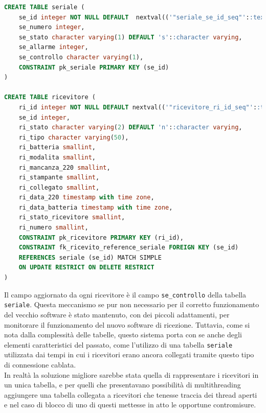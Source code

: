 \begin{lstlisting}[language=SQL,caption=Tabelle ricevitori,label=lst:sqlricevitori]
CREATE TABLE seriale (
    se_id integer NOT NULL DEFAULT 	nextval(('"seriale_se_id_seq"'::text)::regclass),
    se_numero integer,
    se_stato character varying(1) DEFAULT 's'::character varying,
    se_allarme integer,
    se_controllo character varying(1),
    CONSTRAINT pk_seriale PRIMARY KEY (se_id)
)

CREATE TABLE ricevitore (
    ri_id integer NOT NULL DEFAULT nextval(('"ricevitore_ri_id_seq"'::text)::regclass),
    se_id integer,
    ri_stato character varying(2) DEFAULT 'n'::character varying,
    ri_tipo character varying(50),
    ri_batteria smallint,
    ri_modalita smallint,
    ri_mancanza_220 smallint,
    ri_stampante smallint,
    ri_collegato smallint,
    ri_data_220 timestamp with time zone,
    ri_data_batteria timestamp with time zone,
    ri_stato_ricevitore smallint,
    ri_numero smallint,
    CONSTRAINT pk_ricevitore PRIMARY KEY (ri_id),
    CONSTRAINT fk_ricevito_reference_seriale FOREIGN KEY (se_id)
    REFERENCES seriale (se_id) MATCH SIMPLE
    ON UPDATE RESTRICT ON DELETE RESTRICT
)
\end{lstlisting}
Il campo aggiornato da ogni ricevitore è il campo \texttt{se\_controllo} della tabella \texttt{seriale}.
Questa meccanismo se pur non necessario per il corretto funzionamento del vecchio software è stato mantenuto, con dei piccoli adattamenti, per monitorare il funzionamento del nuovo software di ricezione.
Tuttavia, come si nota dalla complessità delle tabelle, questo sistema porta con se anche degli elementi caratteristici del passato, come l'utilizzo di una tabella \texttt{seriale} utilizzata dai tempi in cui i ricevitori erano ancora collegati tramite questo tipo di connessione cablata.\\
In realtà la soluzione migliore sarebbe stata quella di rappresentare i ricevitori in un unica tabella, e per quelli che presentavano possibilità di multithreading aggiungere una tabella collegata a ricevitori che tenesse traccia dei thread aperti e nel caso di blocco di uno di questi mettesse in atto le opportune contromisure.

